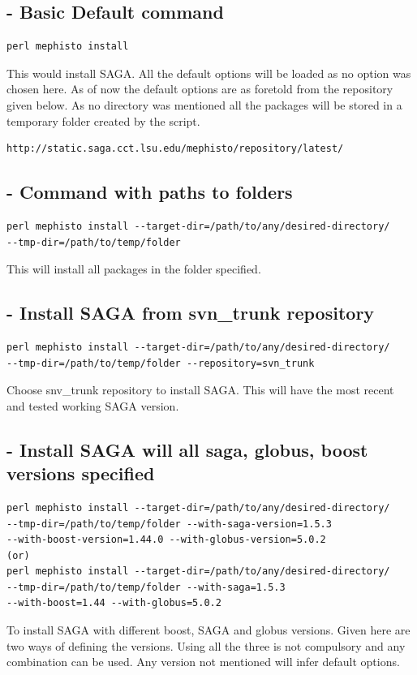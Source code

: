 \documentclass[a4paper,10pt]{article}
\begin{document}
\subsection*{- Basic Default command}
\begin{verbatim}
perl mephisto install 
\end{verbatim}
This would install SAGA. All the default options will be loaded as no
option was chosen here. As of now the default options are as foretold 
from the repository given below. As no directory was mentioned all the 
packages will be stored in a temporary folder created by the script.
\begin{verbatim}
http://static.saga.cct.lsu.edu/mephisto/repository/latest/
\end{verbatim}

\subsection*{- Command with paths to folders}
\begin{verbatim}
perl mephisto install --target-dir=/path/to/any/desired-directory/ 
--tmp-dir=/path/to/temp/folder 
\end{verbatim}
This will install all packages in the folder specified. 
\subsection*{- Install SAGA from svn\_trunk repository}
\begin{verbatim}
perl mephisto install --target-dir=/path/to/any/desired-directory/ 
--tmp-dir=/path/to/temp/folder --repository=svn_trunk
\end{verbatim}
Choose snv\_trunk repository to install SAGA. This will have the most
recent and tested working SAGA version. 
\subsection*{- Install SAGA will all saga, globus, boost versions specified}
\begin{verbatim}
perl mephisto install --target-dir=/path/to/any/desired-directory/ 
--tmp-dir=/path/to/temp/folder --with-saga-version=1.5.3 
--with-boost-version=1.44.0 --with-globus-version=5.0.2
(or)
perl mephisto install --target-dir=/path/to/any/desired-directory/ 
--tmp-dir=/path/to/temp/folder --with-saga=1.5.3 
--with-boost=1.44 --with-globus=5.0.2
\end{verbatim}
To install SAGA with different boost, SAGA and globus versions.
Given here are two ways of defining the versions. Using all the three 
is not compulsory and any combination can be used. Any version 
not mentioned will infer default options. 
\end{document}
